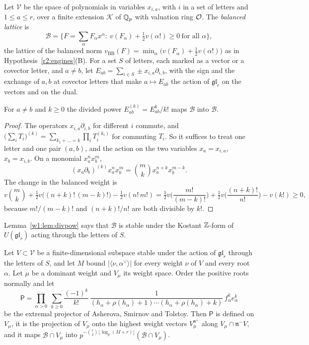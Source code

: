 Let $\mathcal V$ be the space of polynomials in variables $x_{i,a}$, with $i$ in a set of letters and $1\le a\le r$, over a finite extension $\mathcal K$ of $\mathbb Q_p$ with valuation ring $\mathcal O$. The \emph{balanced lattice} is
\[
\mathcal B=\Big\{F=\sum_\alpha F_\alpha x^\alpha:\ v(F_\alpha)+\tfrac12v(\alpha!)\ge0\ \text{for all }\alpha\Big\},
\]
the lattice of the balanced norm $v_{\mathrm{BB}}(F)=\min_\alpha\big(v(F_\alpha)+\frac12v(\alpha!)\big)$ as in Hypothesis~\ref{r2:engines}(B). For a set $S$ of letters, each marked as a vector or a covector letter, and $a\ne b$, let $E_{ab}=\sum_{i\in S}\pm x_{i,a}\partial_{i,b}$, with the sign and the exchange of $a,b$ at covector letters that make $a\mapsto E_{ab}$ the action of $\mathfrak{gl}_r$ on the vectors and on the dual.

\begin{lemma}\label{w1:lem:divpow}
For $a\ne b$ and $k\ge0$ the divided power $E_{ab}^{(k)}=E_{ab}^k/k!$ maps $\mathcal B$ into $\mathcal B$.
\end{lemma}

\begin{proof}
The operators $x_{i,a}\partial_{i,b}$ for different $i$ commute, and $\big(\sum_iT_i\big)^{(k)}=\sum_{k_1+\dots=k}\prod_iT_i^{(k_i)}$ for commuting $T_i$. So it suffices to treat one letter and one pair $(a,b)$, and the action on the two variables $x_a=x_{i,a}$, $x_b=x_{i,b}$. On a monomial $x_a^nx_b^m$,
\[
(x_a\partial_b)^{(k)}x_a^nx_b^m=\binom mk x_a^{n+k}x_b^{m-k}.
\]
The change in the balanced weight is
\[
v\binom mk+\tfrac12v\big((n+k)!\,(m-k)!\big)-\tfrac12v(n!\,m!)=\tfrac12v\Big(\frac{m!}{(m-k)!}\Big)+\tfrac12v\Big(\frac{(n+k)!}{n!}\Big)-v(k!)\ge0,
\]
because $m!/(m-k)!$ and $(n+k)!/n!$ are both divisible by $k!$.
\end{proof}

Lemma~\ref{w1:lem:divpow} says that $\mathcal B$ is stable under the Kostant $\mathbb Z$-form of $U(\mathfrak{gl}_r)$ acting through the letters of $S$.

\begin{proposition}\label{w1:prop:extremal}
Let $V\subset\mathcal V$ be a finite-dimensional subspace stable under the action of $\mathfrak{gl}_r$ through the letters of $S$, and let $M$ bound $\lvert\langle\nu,\alpha^\vee\rangle\rvert$ for every weight $\nu$ of $V$ and every root $\alpha$. Let $\mu$ be a dominant weight and $V_\mu$ its weight space. Order the positive roots normally and let
\[
\mathsf P=\prod_{\alpha>0}\ \sum_{k\ge0}\frac{(-1)^k}{k!}\,\frac{1}{(h_\alpha+\rho(h_\alpha)+1)\cdots(h_\alpha+\rho(h_\alpha)+k)}\,f_\alpha^ke_\alpha^k
\]
be the extremal projector of Asherova, Smirnov and Tolstoy. Then $\mathsf P$ is defined on $V_\mu$, it is the projection of $V_\mu$ onto the highest weight vectors $V_\mu^{\mathfrak n^+}$ along $V_\mu\cap\mathfrak n^-V$, and it maps $\mathcal B\cap V_\mu$ into $p^{-\binom r2\lfloor\log_p(M+r)\rfloor}(\mathcal B\cap V_\mu)$.
\end{proposition}

